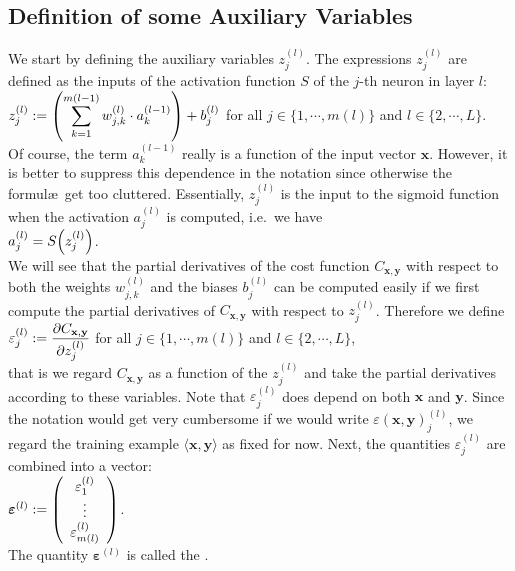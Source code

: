 \subsection{Definition of some Auxiliary Variables}
We start by defining the auxiliary variables $z_j^{(l)}$.
 The expressions $z_j^{(l)}$  are defined as the inputs of the activation function $S$ of the $j$-th neuron in
 layer $l$:
\\[0.2cm]
\hspace*{1.3cm}
$\displaystyle z_j^{(l)} := \left(\sum\limits_{k=1}^{m(l-1)}  w_{j,k}^{(l)} \cdot a_k^{(l-1)}\right) + b_j^{(l)}$
\quad for all  $j \in \{1, \cdots, m(l)\}$ and $l \in \{2,\cdots,L\}$.
\\[0.2cm]
Of course, the term  $a_k^{(l-1)}$ really is a function of the input vector $\mathbf{x}$.  However, it is better to suppress
this dependence in the notation since otherwise the formul\ae\ get too cluttered.
Essentially, $z_j^{(l)}$ is the input to the sigmoid function when the activation $a_j^{(l)}$ is computed,
i.e.~we have
\\[0.2cm]
\hspace*{1.3cm}
$a_j^{(l)} = S\Bigl(z_j^{(l)}\Bigr)$.
\\[0.2cm]
We will see that the partial derivatives of the cost function $C_{\mathbf{x}, \mathbf{y}}$ with respect to both the weights
$w_{j,k}^{(l)}$ and the biases $b_j^{(l)}$ can be computed easily if we first compute the partial derivatives
of $C_{\mathbf{x}, \mathbf{y}}$ with respect to $z_j^{(l)}$.  Therefore we define
\\[0.2cm]
\hspace*{1.3cm}
$\displaystyle\varepsilon_j^{(l)} := \frac{\partial C_{\mathbf{x}, \mathbf{y}}}{\partial z_j^{(l)}}$ \quad for all $j \in \{1, \cdots, m(l)\}$ and $l \in \{2,\cdots, L\}$,
\\[0.2cm]
that is we regard $C_{\mathbf{x}, \mathbf{y}}$ as a function of the $z_j^{(l)}$ and take the partial
derivatives according to these variables.  
Note that $\varepsilon_j^{(l)}$ does depend on both $\mathbf{x}$ and $\mathbf{y}$.  Since the notation would
get very cumbersome if we would write $\varepsilon(\mathbf{x}, \mathbf{y})_j^{(l)}$, we regard the training
example $\langle\mathbf{x}, \mathbf{y}\rangle$ as fixed for now.  Next, the quantities $\varepsilon_j^{(l)}$ are combined into a vector:
\\[0.2cm]
\hspace*{1.3cm}
$\boldsymbol{\varepsilon}^{(l)} := \left(
  \begin{array}[c]{c}
    \varepsilon_1^{(l)}      \\
    \vdots             \\
    \varepsilon_{m(l)}^{(l)}  
  \end{array}
  \right)
$.
\\[0.2cm]
The quantity $\boldsymbol{\varepsilon}^{(l)}$ is called the .

